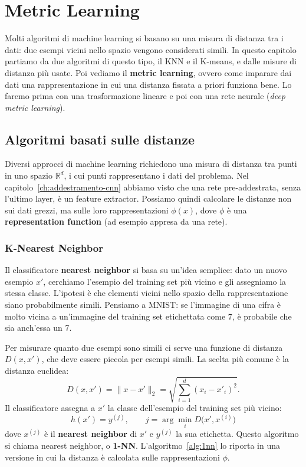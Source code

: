 \chapter{Metric Learning}\label{ch:metric-learning}
Molti algoritmi di machine learning si basano su una misura di distanza tra i dati: due esempi vicini nello spazio vengono considerati simili. In questo capitolo partiamo da due algoritmi di questo tipo, il KNN e il K-means, e dalle misure di distanza più usate. Poi vediamo il \textbf{metric learning}, ovvero come imparare dai dati una rappresentazione in cui una distanza fissata a priori funziona bene. Lo faremo prima con una trasformazione lineare e poi con una rete neurale (\emph{deep metric learning}).

\section{Algoritmi basati sulle distanze}
Diversi approcci di machine learning richiedono una misura di distanza tra punti in uno spazio $\mathbb{R}^d$, i cui punti rappresentano i dati del problema. Nel capitolo~\ref{ch:addestramento-cnn} abbiamo visto che una rete pre-addestrata, senza l'ultimo layer, è un feature extractor. Possiamo quindi calcolare le distanze non sui dati grezzi, ma sulle loro rappresentazioni $\phi(x)$, dove $\phi$ è una \textbf{representation function} (ad esempio appresa da una rete).

\subsection{K-Nearest Neighbor}
Il classificatore \textbf{nearest neighbor} si basa su un'idea semplice: dato un nuovo esempio $x'$, cerchiamo l'esempio del training set più vicino e gli assegniamo la stessa classe. L'ipotesi è che elementi vicini nello spazio della rappresentazione siano probabilmente simili. Pensiamo a MNIST: se l'immagine di una cifra è molto vicina a un'immagine del training set etichettata come 7, è probabile che sia anch'essa un 7.

Per misurare quanto due esempi sono simili ci serve una funzione di distanza $D(x, x')$, che deve essere piccola per esempi simili. La scelta più comune è la distanza euclidea:
\[
D(x, x') = \|x - x'\|_2 = \sqrt{\sum_{i=1}^{d} (x_i - x'_i)^2}.
\]
Il classificatore assegna a $x'$ la classe dell'esempio del training set più vicino:
\[
h(x') = y^{(j)}, \qquad j = \arg\min_{i} D\big(x', x^{(i)}\big)
\]
dove $x^{(j)}$ è il \textbf{nearest neighbor} di $x'$ e $y^{(j)}$ la sua etichetta. Questo algoritmo si chiama nearest neighbor, o \textbf{1-NN}. L'algoritmo~\ref{alg:1nn} lo riporta in una versione in cui la distanza è calcolata sulle rappresentazioni $\phi$.

